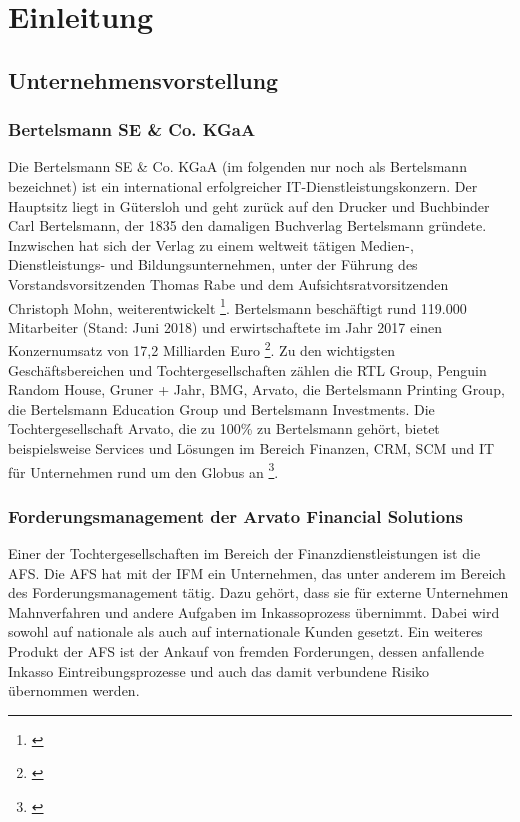 \section{Einleitung}


\subsection{Unternehmensvorstellung}
\subsubsection{Bertelsmann SE \& Co. KGaA} Die Bertelsmann SE \& Co. KGaA (im folgenden nur noch als Bertelsmann bezeichnet) ist ein international erfolgreicher IT-Dienstleistungskonzern. Der Hauptsitz liegt in Gütersloh und geht zurück auf den Drucker und Buchbinder Carl Bertelsmann, der 1835 den damaligen Buchverlag Bertelsmann gründete. Inzwischen hat sich der Verlag zu einem weltweit tätigen Medien-, Dienstleistungs- und Bildungsunternehmen, unter der Führung des Vorstandsvorsitzenden Thomas Rabe und dem Aufsichtsratvorsitzenden Christoph Mohn, weiterentwickelt \footnote{\cite{BertelsmannGeschaeftsbericht2016}}. Bertelsmann beschäftigt rund 119.000 Mitarbeiter (Stand: Juni 2018) und erwirtschaftete im Jahr 2017 einen Konzernumsatz von 17,2 Milliarden Euro \footnote{\cite{BertelsmannAufEinenBlick2018}}. Zu den wichtigsten Geschäftsbereichen und Tochtergesellschaften zählen die RTL Group, Penguin Random House, Gruner + Jahr, BMG, Arvato, die Bertelsmann Printing Group, die Bertelsmann Education Group und Bertelsmann Investments. Die Tochtergesellschaft Arvato, die zu 100\% zu Bertelsmann gehört, bietet beispielsweise Services und Lösungen im Bereich Finanzen, \gls{CRM}, \gls{SCM} und IT für Unternehmen rund um den Globus an \footnote{\cite{BertelsmannGeschaeftsbericht2016}}.


\subsubsection{Forderungsmanagement der Arvato Financial Solutions}
Einer der Tochtergesellschaften im Bereich der Finanzdienstleistungen ist die \gls{AFS}. Die \gls{AFS} hat mit der \gls{IFM} ein Unternehmen, das unter anderem im Bereich des Forderungsmanagement tätig. Dazu gehört, dass sie für externe Unternehmen Mahnverfahren und andere Aufgaben im Inkassoprozess übernimmt. Dabei wird sowohl auf nationale als auch auf internationale Kunden gesetzt. Ein weiteres Produkt der \gls{AFS} ist der Ankauf von fremden Forderungen, dessen anfallende Inkasso Eintreibungsprozesse und auch das damit verbundene Risiko übernommen werden. 

